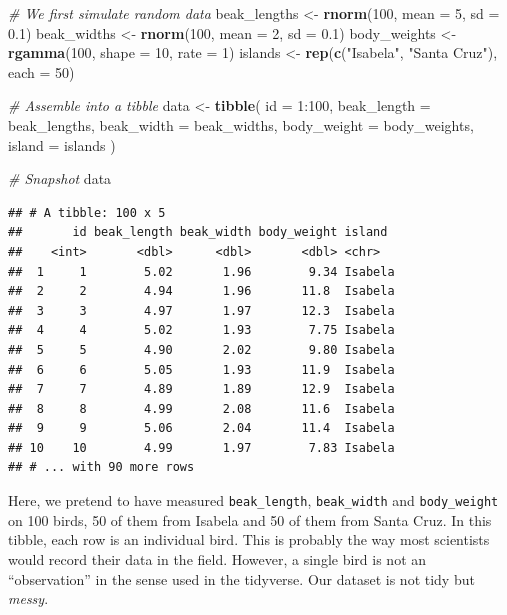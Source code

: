 \documentclass[]{book}
\newenvironment{Shaded}{}{}
\newcommand{\CommentTok}[1]{\textcolor[rgb]{0.38,0.63,0.69}{\textit{#1}}}
\newcommand{\DataTypeTok}[1]{\textcolor[rgb]{0.56,0.13,0.00}{#1}}
\newcommand{\DecValTok}[1]{\textcolor[rgb]{0.25,0.63,0.44}{#1}}
\newcommand{\FloatTok}[1]{\textcolor[rgb]{0.25,0.63,0.44}{#1}}
\newcommand{\KeywordTok}[1]{\textcolor[rgb]{0.00,0.44,0.13}{\textbf{#1}}}
\newcommand{\NormalTok}[1]{#1}
\newcommand{\OperatorTok}[1]{\textcolor[rgb]{0.40,0.40,0.40}{#1}}
\newcommand{\StringTok}[1]{\textcolor[rgb]{0.25,0.44,0.63}{#1}}
\begin{document}
\begin{Shaded}
\begin{Highlighting}[]
\CommentTok{# We first simulate random data}
\NormalTok{beak_lengths <-}\StringTok{ }\KeywordTok{rnorm}\NormalTok{(}\DecValTok{100}\NormalTok{, }\DataTypeTok{mean =} \DecValTok{5}\NormalTok{, }\DataTypeTok{sd =} \FloatTok{0.1}\NormalTok{)}
\NormalTok{beak_widths <-}\StringTok{ }\KeywordTok{rnorm}\NormalTok{(}\DecValTok{100}\NormalTok{, }\DataTypeTok{mean =} \DecValTok{2}\NormalTok{, }\DataTypeTok{sd =} \FloatTok{0.1}\NormalTok{)}
\NormalTok{body_weights <-}\StringTok{ }\KeywordTok{rgamma}\NormalTok{(}\DecValTok{100}\NormalTok{, }\DataTypeTok{shape =} \DecValTok{10}\NormalTok{, }\DataTypeTok{rate =} \DecValTok{1}\NormalTok{)}
\NormalTok{islands <-}\StringTok{ }\KeywordTok{rep}\NormalTok{(}\KeywordTok{c}\NormalTok{(}\StringTok{"Isabela"}\NormalTok{, }\StringTok{"Santa Cruz"}\NormalTok{), }\DataTypeTok{each =} \DecValTok{50}\NormalTok{)}

\CommentTok{# Assemble into a tibble}
\NormalTok{data <-}\StringTok{ }\KeywordTok{tibble}\NormalTok{(}
  \DataTypeTok{id =} \DecValTok{1}\OperatorTok{:}\DecValTok{100}\NormalTok{,}
  \DataTypeTok{beak_length =}\NormalTok{ beak_lengths, }
  \DataTypeTok{beak_width =}\NormalTok{ beak_widths, }
  \DataTypeTok{body_weight =}\NormalTok{ body_weights,}
  \DataTypeTok{island =}\NormalTok{ islands}
\NormalTok{)}

\CommentTok{# Snapshot}
\NormalTok{data}
\end{Highlighting}
\end{Shaded}

\begin{verbatim}
## # A tibble: 100 x 5
##       id beak_length beak_width body_weight island 
##    <int>       <dbl>      <dbl>       <dbl> <chr>  
##  1     1        5.02       1.96        9.34 Isabela
##  2     2        4.94       1.96       11.8  Isabela
##  3     3        4.97       1.97       12.3  Isabela
##  4     4        5.02       1.93        7.75 Isabela
##  5     5        4.90       2.02        9.80 Isabela
##  6     6        5.05       1.93       11.9  Isabela
##  7     7        4.89       1.89       12.9  Isabela
##  8     8        4.99       2.08       11.6  Isabela
##  9     9        5.06       2.04       11.4  Isabela
## 10    10        4.99       1.97        7.83 Isabela
## # ... with 90 more rows
\end{verbatim}

Here, we pretend to have measured \texttt{beak\_length}, \texttt{beak\_width} and \texttt{body\_weight} on 100 birds, 50 of them from Isabela and 50 of them from Santa Cruz. In this tibble, each row is an individual bird. This is probably the way most scientists would record their data in the field. However, a single bird is not an ``observation'' in the sense used in the tidyverse. Our dataset is not tidy but \emph{messy}.
\end{document}
